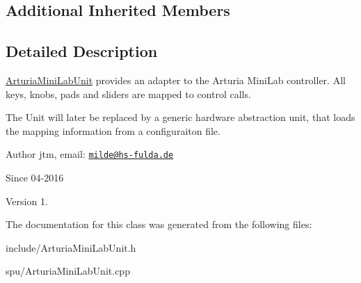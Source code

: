 \subsection*{Additional Inherited Members}


\subsection{Detailed Description}
\hyperlink{classArturiaMiniLabUnit}{Arturia\+Mini\+Lab\+Unit} provides an adapter to the Arturia Mini\+Lab controller. All keys, knobs, pads and sliders are mapped to control calls.

The Unit will later be replaced by a generic hardware abstraction unit, that loads the mapping information from a configuraiton file.

\begin{DoxyAuthor}{Author}
jtm, email\+:  \href{mailto:milde@hs-fulda.de}{\tt milde@hs-\/fulda.\+de} 
\end{DoxyAuthor}
\begin{DoxySince}{Since}
04-\/2016 
\end{DoxySince}
\begin{DoxyVersion}{Version}
1. 
\end{DoxyVersion}


The documentation for this class was generated from the following files\+:\begin{DoxyCompactItemize}
\item 
include/Arturia\+Mini\+Lab\+Unit.\+h\item 
spu/Arturia\+Mini\+Lab\+Unit.\+cpp\end{DoxyCompactItemize}

